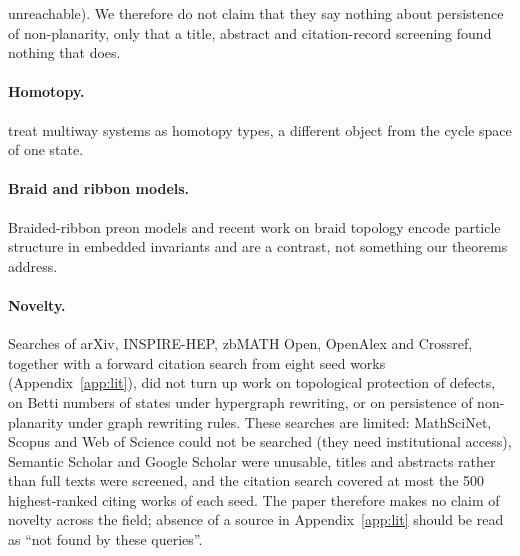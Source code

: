\documentclass[10pt]{article}
\theoremstyle{definition}
\theoremstyle{plain}
\theoremstyle{remark}
\begin{document}
unreachable). We therefore do not claim that they say nothing about persistence of non-planarity, only that a title, abstract and citation-record screening found nothing that does.

\paragraph{Homotopy.} \citet{arsiwalla2021pregeometric} treat multiway systems as homotopy types, a different object from the cycle space of one state.

\paragraph{Braid and ribbon models.} Braided-ribbon preon models \citep{bilsonthompson2005,bilsonthompson2007} and recent work on braid topology \citep{chester2025preons} encode particle structure in embedded invariants and are a contrast, not something our theorems address.

\paragraph{Novelty.} Searches of arXiv, INSPIRE-HEP, zbMATH Open, OpenAlex and Crossref, together with a forward citation search from eight seed works (Appendix~\ref{app:lit}), did not turn up work on topological protection of defects, on Betti numbers of states under hypergraph rewriting, or on persistence of non-planarity under graph rewriting rules. These searches are limited: MathSciNet, Scopus and Web of Science could not be searched (they need institutional access), Semantic Scholar and Google Scholar were unusable, titles and abstracts rather than full texts were screened, and the citation search covered at most the 500 highest-ranked citing works of each seed. The paper therefore makes no claim of novelty across the field; absence of a source in Appendix~\ref{app:lit} should be read as ``not found by these queries''.

\end{document}
